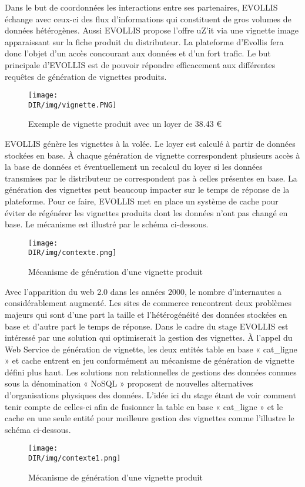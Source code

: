 Dans le but de coordonnées les interactions entre ses partenaires, \textsf{EVOLLIS} 
échange avec ceux-ci des flux d'informations qui constituent de gros volumes de 
données hétérogènes. Aussi \textsf{EVOLLIS} propose l'offre \textsf{uZ'it} via une 
vignette image apparaissant sur la fiche produit du distributeur. La plateforme
d'Evollis fera donc l'objet d'un accès concourant aux données et d'un fort trafic.
Le but principale d'\textsf{EVOLLIS} est de pouvoir répondre efficacement aux 
différentes requêtes de génération de vignettes produits.
\begin {figure}[H]
       \centering
        \texttt{[image: \\DIR/img/vignette.PNG]}		
        \caption{Exemple de vignette produit avec un loyer de 38.43 €}
	\label{sqoop}
  \end {figure}    
\noindent
\textsf{EVOLLIS} génère les vignettes à la volée. Le loyer est calculé à partir de 
données stockées en base. À chaque génération de vignette correspondent plusieurs 
accès à la base de données et éventuellement un recalcul du loyer si les données 
transmises par le distributeur ne correspondent pas à celles présentes en base.
La génération des vignettes peut beaucoup impacter sur le temps de réponse de 
la plateforme. Pour ce faire, \textsf{EVOLLIS} met en place un système de cache
pour éviter de régénérer les vignettes produits dont les données n'ont pas changé en base. 
Le mécanisme est illustré par le schéma ci-dessous.
\begin {figure}[H]
       \centering
        \texttt{[image: \\DIR/img/contexte.png]}	
        \caption{Mécanisme de génération d'une vignette produit}
	\label{sqoop}
  \end {figure}    
\noindent
Avec l'apparition du \textsf{web 2.0} dans les années $2000$, le nombre d'internautes 
a considérablement augmenté. Les sites de commerce rencontrent deux problèmes majeurs
qui sont d'une part la taille et l'hétérogénéité des données stockées en base et d'autre part
le temps de réponse. Dans le cadre du stage \textsf{EVOLLIS} est intéressé par une solution
qui optimiserait la gestion des vignettes. À l'appel du \textsf{Web Service} de génération
de vignette, les deux entités table en base « \textsf{cat\_ligne} » et cache entrent en jeu 
conformément au mécanisme de génération de vignette défini plus haut. Les solutions non 
relationnelles de gestions des données connues sous la dénomination « \textsf{NoSQL} » 
proposent de nouvelles alternatives d'organisations physiques des données. L'idée ici du stage 
étant de voir comment tenir compte de celles-ci afin de fusionner la table en base 
« \textsf{cat\_ligne} » et le cache en une seule entité pour meilleure gestion des vignettes comme
l'illustre le schéma ci-dessous. 
\begin {figure}[H]
       \centering
        \texttt{[image: \\DIR/img/contexte1.png]}	
        \caption{Mécanisme de génération d'une vignette produit}
	\label{sqoop}
  \end {figure}    

